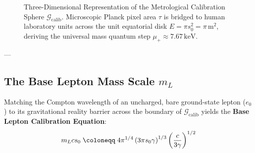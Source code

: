 \documentclass[
    12pt,
    a4paper,
    headings=normal,
    twoside=false,
    open=any,
    parskip=half
]{scrbook}
\let\hbar\relax
\begin{document}
\begin{figure}[htbp]
\caption{Three-Dimensional Representation of the Metrological Calibration Sphere $\mathcal{G}_{\text{calib}}$. Microscopic Planck pixel area $\tau$ is bridged to human laboratory units across the unit equatorial disk $E = \pi s_0^2 = \pi\,\text{m}^2$, deriving the universal mass quantum step $\mu_+ \approx 7.67\,\text{keV}$.}
\label{fig:ch5_calibration_sphere_3d}
\end{figure}

---

\subsection{The Base Lepton Mass Scale $m_L$}

Matching the Compton wavelength of an uncharged, bare ground-state lepton ($e_0$) to its gravitational reality barrier across the boundary of $\mathcal{G}_{\text{calib}}$ yields the \textbf{Base Lepton Calibration Equation}:
\begin{equation}
m_L c s_0 \;\coloneqq\; 4 \pi^{1/4} \left( 3\pi s_0 \gamma \hbar \right)^{1/3} \left( \frac{c\hbar}{3\gamma} \right)^{1/2}
\label{eq:ch5_base_lepton_calibration}
\end{equation}
\end{document}

